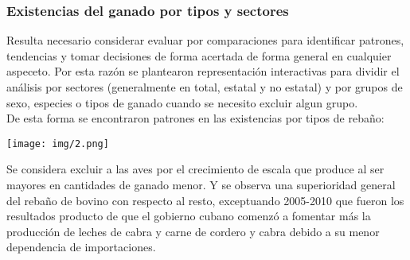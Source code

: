 \documentclass{article}
\begin{document}
\subsubsection{Existencias del ganado por tipos y sectores}
Resulta necesario considerar evaluar por comparaciones para identificar patrones, tendencias y tomar decisiones de forma acertada de forma general en cualquier aspeceto. Por
esta razón se plantearon representación interactivas para dividir el análisis por sectores (generalmente en total, estatal  y no estatal) y por grupos de sexo, especies o 
tipos de ganado cuando se necesito excluir algun grupo.\\

De esta forma se encontraron patrones en las existencias por tipos de rebaño:
\begin{center}
\texttt{[image: img/2.png]}
\end{center}
Se considera excluir a las aves por el crecimiento de escala que produce al ser mayores en cantidades de ganado menor. Y se observa una superioridad general del rebaño de bovino
con respecto al resto, exceptuando 2005-2010 que fueron los resultados producto de que el gobierno cubano comenzó a fomentar más la producción de leches de cabra y carne de cordero 
y cabra debido a su menor dependencia de importaciones.\\
\end{document}
